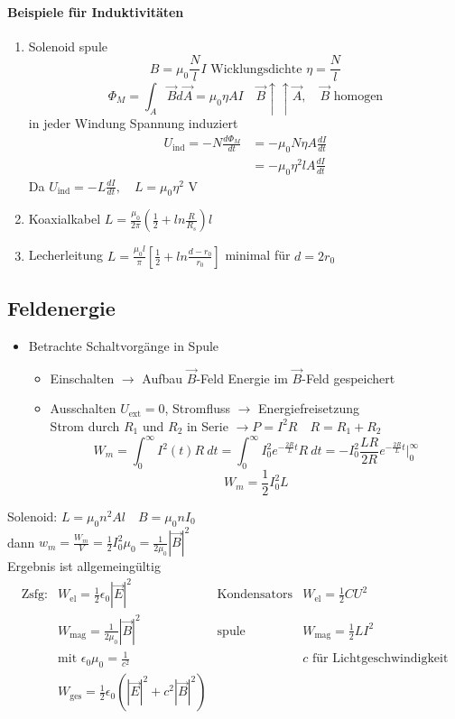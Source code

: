 \documentclass[titlepage,12pt,a4paper,ngerman]{report}
\newcommand{\tx}[1]{\textrm{#1}}
\newcommand{\uind}{U_{\tx{ind}}}
\begin{document}
\paragraph{Beispiele für Induktivitäten}
\begin{enumerate}
	\item Solenoid spule 
	$$B = \mu_0 \frac{N}{l} I \tx{ Wicklungsdichte } \eta = \frac{N}{l}$$
	$$\Phi_M = \int_A \vec{B} d\vec{A} = \mu_0 \eta A I \quad \vec{B}\uparrow \uparrow \vec{A}, \quad \vec{B} \tx{ homogen}$$
	in jeder Windung Spannung induziert
	\begin{align*}
	\uind = - N \frac{d \Phi_M}{dt} &= - \mu_0 N \eta A \frac{dI}{dt}\\
	&=- \mu_0 \eta^2 l A \frac{dI}{dt}
	\end{align*}
	Da $\uind = -L \frac{dI}{dt}, \quad L = \mu_0 \eta^2 \tx{ V}$ 
	\item Koaxialkabel $L = \frac{\mu_0}{2 \pi} ( \frac{1}{2} + ln \frac{R}{R_s}) l$
	\item Lecherleitung $L = \frac{\mu_0 l}{\pi} [\frac{1}{2} + ln \frac{d - r_0}{r_0}]$ minimal für $d= 2r_0$  
\end{enumerate}
\subsection{Feldenergie}
\begin{itemize}
	\item Betrachte Schaltvorgänge in Spule 
	\begin{itemize}
		\item Einschalten $\rightarrow$ Aufbau $\vec{B}$-Feld Energie im $\vec{B}$-Feld gespeichert
		\item Ausschalten $U_{\tx{ext}} = 0$, Stromfluss $\rightarrow$ Energiefreisetzung\\
		Strom durch $R_1$ und $R_2$ in Serie $\rightarrow P = I^2 R \quad R = R_1 + R_2$
		$$W_m = \int_0^\infty I^2 (t) R\ dt = \int_0^\infty I_0^2 e^{-\frac{2R}{L} t} R\ dt = - I_0^2 \frac{LR}{2R}e^{-\frac{2R}{L} t} \bigg|_0^\infty$$
		$$\boxed{W_m = \frac{1}{2}I_0^2 L}$$
	\end{itemize}
\end{itemize}
Solenoid: $L = \mu_0 n^2 Al \quad B = \mu_0 n I_0$\\
dann $w_m = \frac{W_m}{V} = \frac{1}{2} I_0^2 \mu_0 =\frac{1}{2\mu_0}| \vec{B}|^2$\\[5pt]
Ergebnis ist allgemeingültig
$$\begin{array}{llll}
\tx{Zsfg}: & W_{\tx{el}} = \frac{1}{2} \epsilon_0 |\vec{E}|^2 & \tx{Kondensators} & W_{\tx{el}} = \frac{1}{2}CU^2 \\
& W_{\tx{mag}} = \frac{1}{2 \mu_0} |\vec{B}|^2 & \tx{spule} & W_{\tx{mag}} = \frac{1}{2}LI^2\\
& \tx{mit } \epsilon_0 \mu_0 = \frac{1}{c^2} && c\tx{ für Lichtgeschwindigkeit} \\
& W_{\tx{ges}} = \frac{1}{2} \epsilon_0 (|\vec{E}|^2 + c^2 |\vec{B}|^2)
\end{array}$$
\end{document}
